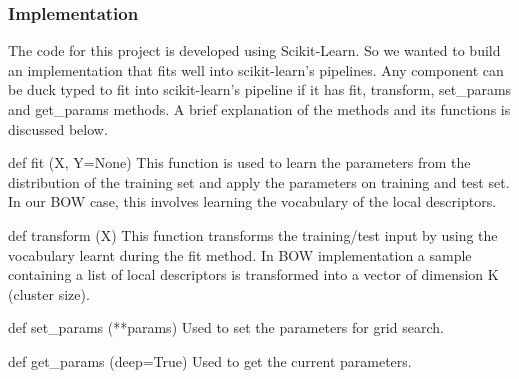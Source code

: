 \documentclass[final,leqno,onefignum,onetabnum]{siamltexmm}
\begin{document}
\subsubsection{Implementation}
The code for this project is developed using Scikit-Learn\cite{website:sklearn}.  So we wanted to build an implementation that fits well into scikit-learn's pipelines.
Any component can be duck typed to fit into scikit-learn's pipeline if it has fit, transform, set\_params and get\_params methods.  A brief explanation of the methods and its functions is discussed below.
\begin{description}
  \item{def fit (X, Y=None)}  This function is used to learn the parameters from the distribution of the training set and apply the parameters on training and test set.  In our BOW case, this involves learning the vocabulary of the local descriptors.
  \item{def transform (X)}  This function transforms the training/test input by using the vocabulary learnt during the fit method.  In BOW implementation a sample containing a list of local descriptors is transformed into a vector of dimension K (cluster size).
  \item{def set\_params (**params)} Used to set the parameters for grid search.
  \item{def get\_params (deep=True)} Used to get the current parameters.
\end{description}
\end{document}
